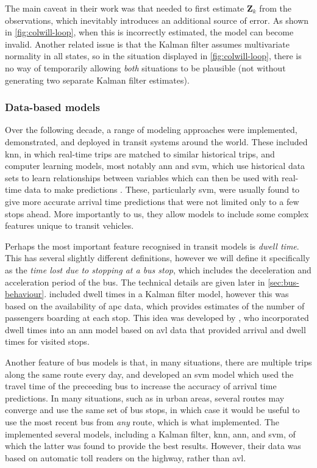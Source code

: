 \documentclass[12pt,a4paper]{article}
\newcommand{\mat}[1]{\mathbf{#1}}
\newcommand{\kf}{Kalman filter}
\begin{document}
The main caveat in their work was that \cite{cathey-dailey:2003} needed to first
estimate $\mat{Z}_k$ from the observations,
which inevitably introduces an additional source of error.
As shown in \cref{fig:colwill-loop}, when this is incorrectly estimated,
the model can become invalid.
Another related issue is that the \kf{} assumes multivariate normality
in all states, so in the situation displayed in \cref{fig:colwill-loop},
there is no way of temporarily allowing \emph{both} situations to be plausible
(not without generating two separate \kf{} estimates).



\subsubsection{Data-based models}
\label{sec:data-models}

Over the following decade, a range of modeling approaches were implemented, demonstrated,
and deployed in transit systems around the world.
These included \gls{knn}, in which real-time trips are matched to similar historical trips,
and computer learning models, most notably \gls{ann} and \gls{svm},
which use historical data sets to learn relationships between variables 
which can then be used with real-time data to make predictions
\citep{park-rilett:1999,jeong-rilett:2005,yu-etal:2006,yu-etal:2010,yu-etal:2011}.
These, particularly \gls{svm}, were usually found to give more accurate arrival time
predictions that were not limited only to a few stops ahead.
More importantly to us, they allow models to include some complex features
unique to transit vehicles.


Perhaps the most important feature recognised in transit models is \emph{dwell time}.
This has several slightly different definitions, 
however we will define it specifically as the \emph{time lost due to stopping at a bus stop},
which includes the deceleration and acceleration period of the bus.
The technical details are given later in \cref{sec:bus-behaviour}.
\cite{shalaby-farhan:2004} included dwell times in a \kf{} model,
however this was based on the availability of \gls{apc} data,
which provides estimates of the number of passengers boarding at each stop.
This idea was developed by \cite{jeong-rilett:2005},
who incorporated dwell times into an \gls{ann} model based on \gls{avl} data
that provided arrival and dwell times for visited stops.


Another feature of bus models is that, in many situations,
there are multiple trips along the same route every day,
and \cite{yu-etal:2006} developed an \gls{svm} model which used the travel time
of the preceeding bus to increase the accuracy of arrival time predictions.
In many situations, such as in urban areas, 
several routes may converge and use the same set of bus stops,
in which case it would be useful to use the most recent bus from \emph{any} route,
which is what \cite{yu-etal:2011} implemented.
The implemented several models, including a \kf{}, \gls{knn}, \gls{ann},
and \gls{svm}, of which the latter was found to provide the best results.
However, their data was based on automatic toll readers on the highway, 
rather than \gls{avl}.
\end{document}
